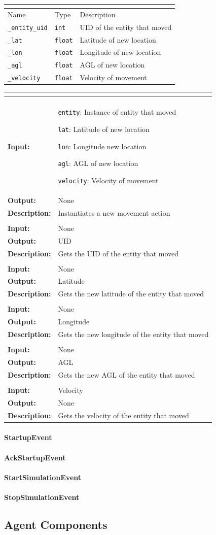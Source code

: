 \documentclass[titlepage]{article}
\renewenvironment{itemize*}%
    {\begin{itemize}%
        \setlength{\itemsep}{0pt}%
        \setlength{\parskip}{0pt}%
        \setlength{\partopsep}{0pt}%
        \setlength{\topsep}{0pt}}%
    {\end{itemize}}
\newcommand{\operations}[1]{
\begin{center}
    \begin{tabular}{|p{3cm}|p{9cm + 2.0\tabcolsep}|}
    \hline
    \multicolumn{2}{|l|}{\cellcolor[gray]{0.5}{\textbf{Operations}}} \\ \hline
#1
    \end{tabular}
\end{center}
}
\newcommand{\operation}[4]{
    \hline
    \multicolumn{2}{|l|}{\cellcolor[gray]{0.8}{\texttt{#1}}} \\ \hline
    \hspace{7pt}\textbf{Input:} & #2 \\ \hline
    \hspace{7pt}\textbf{Output:} & #3 \\ \hline
    \hspace{7pt}\textbf{Description:} & #4 \\ \hline
}
\newcommand{\attributes}[1]{
    \begin{center}
        \begin{tabular}{|p{4cm}|p{4cm}|p{4cm}|}
            \multicolumn{3}{|l|}{\cellcolor[gray]{0.5}{\textbf{Attributes}}} \\ \hline
            \rowcolor[gray]{0.8} Name & Type & Description \\ \hline 
            #1
        \end{tabular}
    \end{center}
}
\newcommand{\attribute}[3]{
    \texttt{#1} & \texttt{#2} & #3 \\ \hline
}
\begin{document}
\attributes{
    \attribute{\_entity\_uid}{int}{UID of the entity that moved}
    \attribute{\_lat}{float}{Latitude of new location}
    \attribute{\_lon}{float}{Longitude of new location}
    \attribute{\_agl}{float}{AGL of new location}
    \attribute{\_velocity}{float}{Velocity of movement}
}

\operations
{
    \operation{\_\_init\_\_(entity, lat, lon, agl, velocity)}
    {
        \begin{itemize*}
            \item \texttt{entity}: Instance of entity that moved
            \item \texttt{lat}: Latitude of new location
            \item \texttt{lon}: Longitude new location
            \item \texttt{agl}: AGL of new location
            \item \texttt{velocity}: Velocity of movement
        \end{itemize*}

    }{None}{Instantiates a new movement action}
    \operation{get\_uid()}{None}{UID}{Gets the UID of the entity that moved}
    \operation{get\_lat()}{None}{Latitude}{Gets the new latitude of the entity that moved}
    \operation{get\_lon()}{None}{Longitude}{Gets the new longitude of the entity that moved}
    \operation{get\_agl()}{None}{AGL}{Gets the new AGL of the entity that moved}
    \operation{get\_velocity()}{Velocity}{None}{Gets the velocity of the entity that moved}
}

\paragraph{StartupEvent}
\paragraph{AckStartupEvent}
\paragraph{StartSimulationEvent}
\paragraph{StopSimulationEvent}

\subsection{Agent Components}
\end{document}
